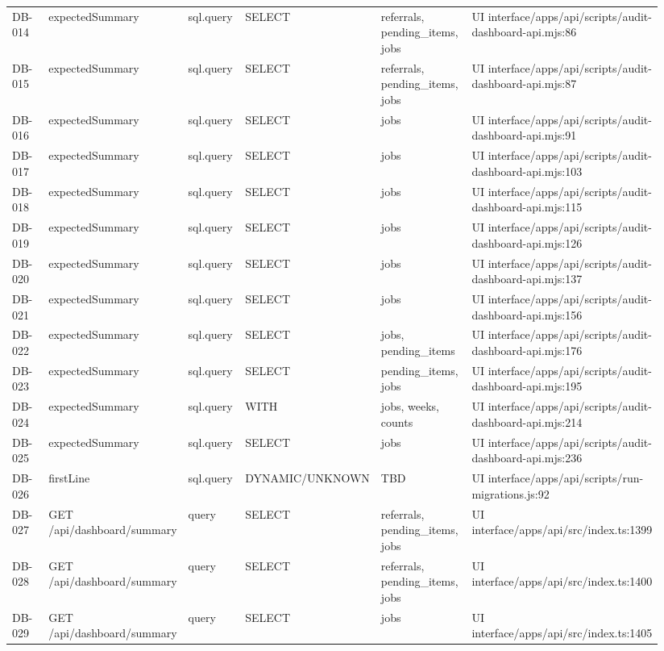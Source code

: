 \documentclass[11pt]{article}
\begin{document}
\begin{longtable}{p{0.10\linewidth}p{0.19\linewidth}p{0.10\linewidth}p{0.18\linewidth}p{0.16\linewidth}p{0.21\linewidth}}
DB-014 & expectedSummary & sql.query & SELECT & referrals, pending\_items, jobs & UI interface/apps/api/scripts/audit-dashboard-api.mjs:86 \\
DB-015 & expectedSummary & sql.query & SELECT & referrals, pending\_items, jobs & UI interface/apps/api/scripts/audit-dashboard-api.mjs:87 \\
DB-016 & expectedSummary & sql.query & SELECT & jobs & UI interface/apps/api/scripts/audit-dashboard-api.mjs:91 \\
DB-017 & expectedSummary & sql.query & SELECT & jobs & UI interface/apps/api/scripts/audit-dashboard-api.mjs:103 \\
DB-018 & expectedSummary & sql.query & SELECT & jobs & UI interface/apps/api/scripts/audit-dashboard-api.mjs:115 \\
DB-019 & expectedSummary & sql.query & SELECT & jobs & UI interface/apps/api/scripts/audit-dashboard-api.mjs:126 \\
DB-020 & expectedSummary & sql.query & SELECT & jobs & UI interface/apps/api/scripts/audit-dashboard-api.mjs:137 \\
DB-021 & expectedSummary & sql.query & SELECT & jobs & UI interface/apps/api/scripts/audit-dashboard-api.mjs:156 \\
DB-022 & expectedSummary & sql.query & SELECT & jobs, pending\_items & UI interface/apps/api/scripts/audit-dashboard-api.mjs:176 \\
DB-023 & expectedSummary & sql.query & SELECT & pending\_items, jobs & UI interface/apps/api/scripts/audit-dashboard-api.mjs:195 \\
DB-024 & expectedSummary & sql.query & WITH & jobs, weeks, counts & UI interface/apps/api/scripts/audit-dashboard-api.mjs:214 \\
DB-025 & expectedSummary & sql.query & SELECT & jobs & UI interface/apps/api/scripts/audit-dashboard-api.mjs:236 \\
DB-026 & firstLine & sql.query & DYNAMIC/UNKNOWN & TBD & UI interface/apps/api/scripts/run-migrations.js:92 \\
DB-027 & GET /api/dashboard/summary & query & SELECT & referrals, pending\_items, jobs & UI interface/apps/api/src/index.ts:1399 \\
DB-028 & GET /api/dashboard/summary & query & SELECT & referrals, pending\_items, jobs & UI interface/apps/api/src/index.ts:1400 \\
DB-029 & GET /api/dashboard/summary & query & SELECT & jobs & UI interface/apps/api/src/index.ts:1405 \\

\end{longtable}
\end{document}
